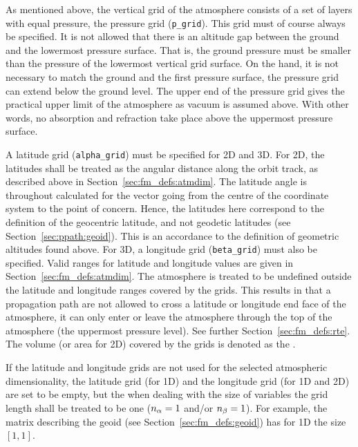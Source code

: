   
\label{sec:fm_defs:grids}

As mentioned above, the vertical grid of the atmosphere consists of a
set of layers with equal pressure, the pressure grid (\verb|p_grid|).
This grid must of course always be specified. It is not allowed that
there is an altitude gap between the ground and the lowermost pressure
surface.  That is, the ground pressure must be smaller than the
pressure of the lowermost vertical grid surface. On the hand, it is
not necessary to match the ground and the first pressure surface, the
pressure grid can extend below the ground level. The upper end of the
pressure grid gives the practical upper limit of the atmosphere as
vacuum is assumed above. With other words, no absorption and
refraction take place above the uppermost pressure surface.

A latitude grid (\verb|alpha_grid|) must be specified for 2D and 3D.
For 2D, the latitudes shall be treated as the angular distance along
the orbit track, as described above in
Section~\ref{sec:fm_defs:atmdim}.  The latitude angle is throughout
calculated for the vector going from the centre of the coordinate
system to the point of concern. Hence, the latitudes here correspond
to the definition of the geocentric latitude, and not geodetic
latitudes (see Section~\ref{sec:ppath:geoid}). This is an accordance
to the definition of geometric altitudes found above. For 3D, a
longitude grid (\verb|beta_grid|) must also be specified. Valid ranges
for latitude and longitude values are given in
Section~\ref{sec:fm_defs:atmdim}.  The atmosphere is treated to be
undefined outside the latitude and longitude ranges covered by the
grids. This results in that a propagation path are not allowed to
cross a latitude or longitude end face of the atmosphere, it can only
enter or leave the atmosphere through the top of the atmosphere (the
uppermost pressure level). See further Section~\ref{sec:fm_defs:rte}.
The volume (or area for 2D) covered by the grids is denoted as the
.

If the latitude and longitude grids are not used for the selected
atmospheric dimensionality, the latitude grid (for 1D) and the
longitude grid (for 1D and 2D) are set to be empty, but the when
dealing with the size of variables the grid length shall be treated to
be one ($n_{\alpha}=1$ and/or $n_{\beta}=1$). For example,
the matrix describing the geoid (see Section~\ref{sec:fm_defs:geoid})
has for 1D the size $[1,1]$.

